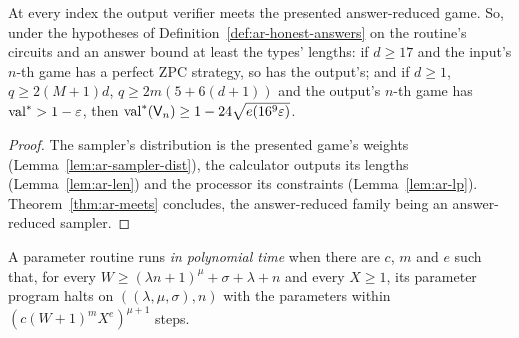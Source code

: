 \begin{theorem}
\label{thm:ar-output}
\leanok
At every index the output verifier meets the presented answer-reduced game. So, under the
hypotheses of Definition~\ref{def:ar-honest-answers} on the routine's circuits and an answer
bound at least the types' lengths: if $d \geq 17$ and the input's $n$-th game has a perfect ZPC
strategy, so has the output's; and if $d \geq 1$, $q \geq 2 (M + 1) d$,
$q \geq 2 m (5 + 6 (d + 1))$ and the output's $n$-th game has $\mathrm{val}^* > 1 - \varepsilon$, then
$\mathrm{val}^*(\mathsf{V}_n) \geq 1 - 24 \sqrt{e(16^9 \varepsilon)}$.
\end{theorem}

\begin{proof}
\leanok
The sampler's distribution is the presented game's weights (Lemma~\ref{lem:ar-sampler-dist}),
the calculator outputs its lengths (Lemma~\ref{lem:ar-len}) and the processor its constraints
(Lemma~\ref{lem:ar-lp}). Theorem~\ref{thm:ar-meets} concludes, the answer-reduced family being an
answer-reduced sampler.
\end{proof}

\begin{definition}
\label{def:ar-par-time}
\leanok
A parameter routine runs \emph{in polynomial time} when there are $c$, $m$ and $e$ such that,
for every $W \geq (\lambda n + 1)^\mu + \sigma + \lambda + n$ and every $X \geq 1$, its parameter
program halts on $((\lambda, \mu, \sigma), n)$ with the parameters within
$(c (W + 1)^m X^e)^{\mu + 1}$ steps.
\end{definition}

